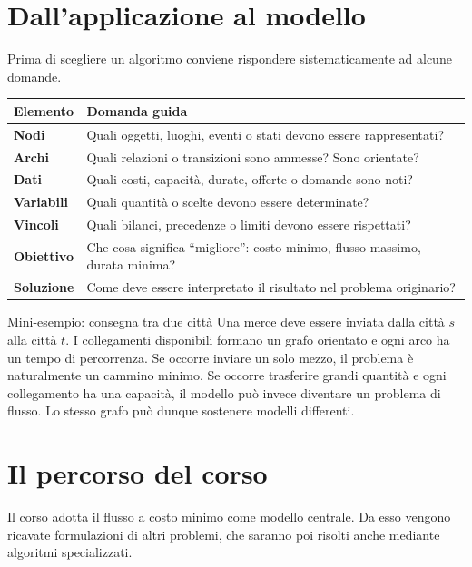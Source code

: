 \documentclass[11pt,a4paper]{article}
\begin{document}
\section{Dall'applicazione al modello}

Prima di scegliere un algoritmo conviene rispondere sistematicamente ad alcune domande.

\begin{longtable}{>{\bfseries}p{3.3cm}p{10.7cm}}
\toprule
Elemento & Domanda guida\\
\midrule
Nodi & Quali oggetti, luoghi, eventi o stati devono essere rappresentati?\\
Archi & Quali relazioni o transizioni sono ammesse? Sono orientate?\\
Dati & Quali costi, capacità, durate, offerte o domande sono noti?\\
Variabili & Quali quantità o scelte devono essere determinate?\\
Vincoli & Quali bilanci, precedenze o limiti devono essere rispettati?\\
Obiettivo & Che cosa significa ``migliore'': costo minimo, flusso massimo, durata minima?\\
Soluzione & Come deve essere interpretato il risultato nel problema originario?\\
\bottomrule
\end{longtable}

\begin{examplebox}{Mini-esempio: consegna tra due città}
Una merce deve essere inviata dalla città $s$ alla città $t$. I collegamenti disponibili formano un grafo orientato e ogni arco ha un tempo di percorrenza. Se occorre inviare un solo mezzo, il problema è naturalmente un cammino minimo. Se occorre trasferire grandi quantità e ogni collegamento ha una capacità, il modello può invece diventare un problema di flusso. Lo stesso grafo può dunque sostenere modelli differenti.
\end{examplebox}

\section{Il percorso del corso}

Il corso adotta il flusso a costo minimo come modello centrale. Da esso vengono ricavate formulazioni di altri problemi, che saranno poi risolti anche mediante algoritmi specializzati.
\end{document}
